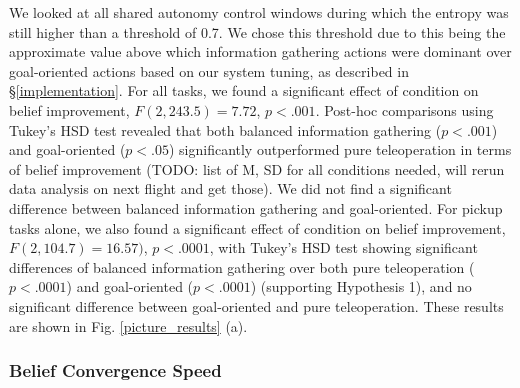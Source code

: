 \documentclass[conference]{IEEEtran}
\begin{document}

We looked at all shared autonomy control windows during which the entropy was still higher than a threshold of 0.7. We chose this threshold due to this being the approximate value above which information gathering actions were dominant over goal-oriented actions based on our system tuning, as described in \S\ref{implementation}. For all tasks, we found a significant effect of condition on belief improvement, $F(2, 243.5) = 7.72$, $p < .001$. Post-hoc comparisons using Tukey's HSD test revealed that both balanced information gathering ($p < .001$) and goal-oriented ($p < .05$) significantly outperformed pure teleoperation in terms of belief improvement (TODO: list of M, SD for all conditions needed, will rerun data analysis on next flight and get those). We did not find a significant difference between balanced information gathering and goal-oriented. For pickup tasks alone, we also found a significant effect of condition on belief improvement, $F(2, 104.7) = 16.57)$, $p < .0001$, with Tukey's HSD test showing significant differences of balanced information gathering over both pure teleoperation ($p < .0001$) and goal-oriented ($p < .0001$) (supporting Hypothesis 1),  and no significant difference between goal-oriented and pure teleoperation. These results are shown in Fig. \ref{picture_results} (a).

\subsubsection{Belief Convergence Speed}
\end{document}
